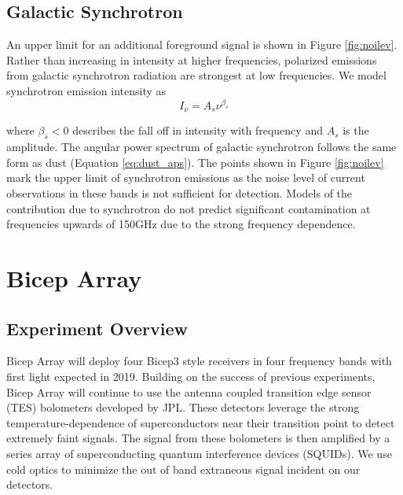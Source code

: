 \documentclass[12pt]{article}
\begin{document}
\subsection{Galactic Synchrotron}
An upper limit for an additional foreground signal is shown in Figure
\ref{fig:noilev}. Rather than increasing in intensity at higher frequencies,
polarized emissions from galactic synchrotron radiation are strongest at low
frequencies. We model synchrotron emission intensity as
\begin{equation}
	I_\nu = A_s \nu^{\beta _s}
	\label{eq:synch_sed}
\end{equation}

where $\beta _s < 0$ describes the fall off in intensity with frequency and
$A_s$ is the amplitude. The angular power spectrum of galactic synchrotron
follows the same form as dust (Equation \ref{eq:dust_aps}). The points shown
in Figure \ref{fig:noilev} mark the upper limit of synchrotron emissions as
the noise level of current observations in these bands is not sufficient for
detection. Models of the contribution due to synchrotron do not predict
significant contamination at frequencies upwards of 150GHz due to the strong
frequency dependence.


\section{Bicep Array}

\subsection{Experiment Overview}
Bicep Array will deploy four Bicep3 style receivers in four frequency bands
with first light expected in 2019. Building on the success of previous
experiments, Bicep Array will continue to use the antenna coupled transition
edge sensor (TES) bolometers developed by JPL. These detectors leverage the strong
temperature-dependence of superconductors near their transition point to
detect extremely faint signals. The signal from these bolometers is then
amplified by a series array of superconducting quantum interference devices
(SQUIDs). We use cold optics to minimize the out of band extraneous signal
incident on our detectors.
\end{document}

